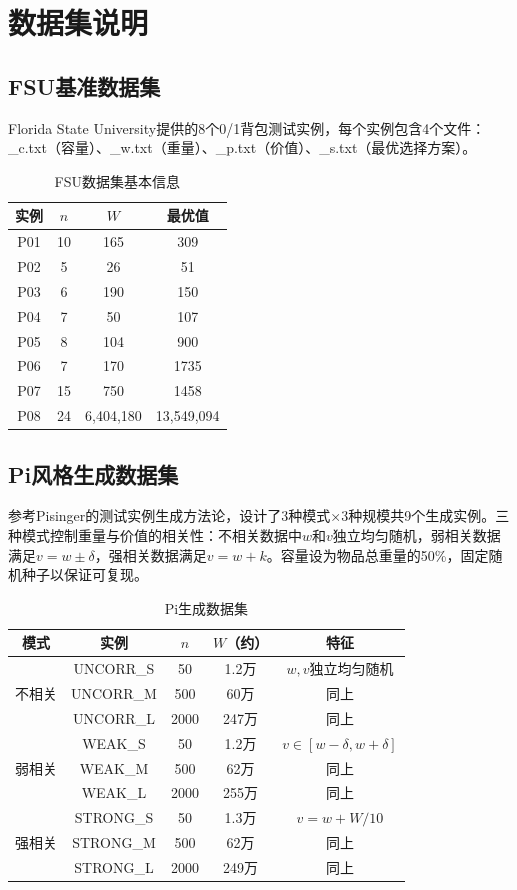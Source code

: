 \documentclass[6pt,a4paper]{ctexart}
\begin{document}

\section{数据集说明}

\subsection{FSU基准数据集}

Florida State University提供的8个0/1背包测试实例，每个实例包含4个文件：\_c.txt（容量）、\_w.txt（重量）、\_p.txt（价值）、\_s.txt（最优选择方案）。

\begin{table}[ht]
\centering
\caption{FSU数据集基本信息}
\begin{tabular}{cccc}
\toprule
实例 & $n$ & $W$ & 最优值 \\
\midrule
P01 & 10 & 165 & 309 \\
P02 & 5 & 26 & 51 \\
P03 & 6 & 190 & 150 \\
P04 & 7 & 50 & 107 \\
P05 & 8 & 104 & 900 \\
P06 & 7 & 170 & 1735 \\
P07 & 15 & 750 & 1458 \\
P08 & 24 & 6,404,180 & 13,549,094 \\
\bottomrule
\end{tabular}
\end{table}

\subsection{Pi风格生成数据集}

参考Pisinger的测试实例生成方法论，设计了3种模式×3种规模共9个生成实例。三种模式控制重量与价值的相关性：不相关数据中$w$和$v$独立均匀随机，弱相关数据满足$v = w \pm \delta$，强相关数据满足$v = w + k$。容量设为物品总重量的50\%，固定随机种子以保证可复现。

\begin{table}[ht]
\centering
\caption{Pi生成数据集}
\begin{tabular}{ccccc}
\toprule
模式 & 实例 & $n$ & $W$（约） & 特征 \\
\midrule
\multirow{3}{*}{不相关} & UNCORR\_S & 50 & 1.2万 & $w, v$独立均匀随机 \\
& UNCORR\_M & 500 & 60万 & 同上 \\
& UNCORR\_L & 2000 & 247万 & 同上 \\
\midrule
\multirow{3}{*}{弱相关} & WEAK\_S & 50 & 1.2万 & $v \in [w-\delta, w+\delta]$ \\
& WEAK\_M & 500 & 62万 & 同上 \\
& WEAK\_L & 2000 & 255万 & 同上 \\
\midrule
\multirow{3}{*}{强相关} & STRONG\_S & 50 & 1.3万 & $v = w + W/10$ \\
& STRONG\_M & 500 & 62万 & 同上 \\
& STRONG\_L & 2000 & 249万 & 同上 \\
\bottomrule
\end{tabular}
\end{table}
\end{document}
